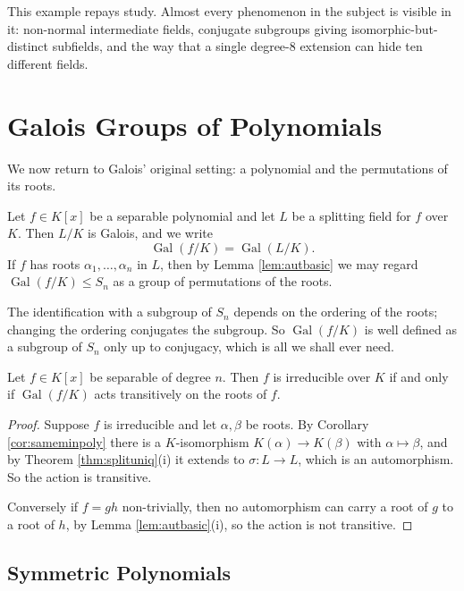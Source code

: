 \documentclass[a4paper]{scrartcl}
\newcommand{\Gal}{\operatorname{Gal}}
\begin{document}
This example repays study. Almost every phenomenon in the subject is visible in it: non-normal intermediate fields, conjugate subgroups giving isomorphic-but-distinct subfields, and the way that a single degree-$8$ extension can hide ten different fields.

\section{Galois Groups of Polynomials}\label{sec:polys}

We now return to Galois' original setting: a polynomial and the permutations of its roots.

\begin{definition}
	Let $f \in K[x]$ be a separable polynomial and let $L$ be a splitting field for $f$ over $K$. Then $L/K$ is Galois, and we write
	$$\Gal(f/K) = \Gal(L/K).$$
	If $f$ has roots $\alpha_1, \dots, \alpha_n$ in $L$, then by Lemma \ref{lem:autbasic} we may regard $\Gal(f/K) \leq S_n$ as a group of permutations of the roots.
\end{definition}

The identification with a subgroup of $S_n$ depends on the ordering of the roots; changing the ordering conjugates the subgroup. So $\Gal(f/K)$ is well defined as a subgroup of $S_n$ only up to conjugacy, which is all we shall ever need.

\begin{proposition}\label{prop:transitive}
	Let $f \in K[x]$ be separable of degree $n$. Then $f$ is irreducible over $K$ if and only if $\Gal(f/K)$ acts transitively on the roots of $f$.
\end{proposition}

\begin{proof}
	Suppose $f$ is irreducible and let $\alpha, \beta$ be roots. By Corollary \ref{cor:sameminpoly} there is a $K$-isomorphism $K(\alpha) \to K(\beta)$ with $\alpha \mapsto \beta$, and by Theorem \ref{thm:splituniq}(i) it extends to $\sigma : L \to L$, which is an automorphism. So the action is transitive.

	Conversely if $f = gh$ non-trivially, then no automorphism can carry a root of $g$ to a root of $h$, by Lemma \ref{lem:autbasic}(i), so the action is not transitive.
\end{proof}

\subsection{Symmetric Polynomials}
\end{document}
